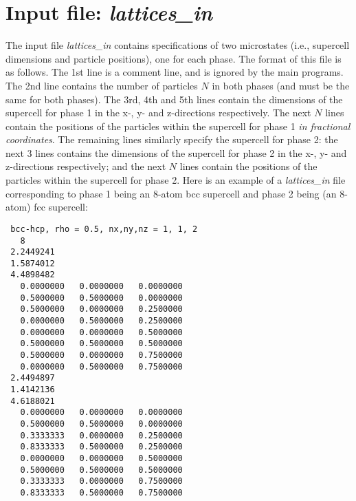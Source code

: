\documentclass{report}
\begin{document}
\section{Input file: \emph{lattices\_in}}
The input file \emph{lattices\_in} contains specifications of two microstates (i.e., supercell dimensions and particle positions), one for
each phase. The format of this file is as follows. The 1st line is a comment line, and is ignored by the main programs. The 2nd line contains
the number of particles $N$ in both phases (and must be the same for both phases). The 3rd, 4th and 5th lines contain the dimensions of the
supercell for phase 1 in the x-, y- and z-directions respectively. The next $N$ lines contain the positions of the particles within the supercell
for phase 1 \emph{in fractional coordinates}. The remaining lines similarly specify the supercell for phase 2: the next 3 lines contains the 
dimensions of the supercell for phase 2 in the x-, y- and z-directions respectively; and the next $N$ lines contain the positions of the 
particles within the supercell for phase 2. Here is an example of a \emph{lattices\_in} file corresponding to phase 1 being an 8-atom bcc
supercell and phase 2 being (an 8-atom) fcc supercell:
\begin{verbatim}
 bcc-hcp, rho = 0.5, nx,ny,nz = 1, 1, 2
   8
 2.2449241     
 1.5874012     
 4.4898482
   0.0000000   0.0000000   0.0000000     
   0.5000000   0.5000000   0.0000000
   0.5000000   0.0000000   0.2500000
   0.0000000   0.5000000   0.2500000
   0.0000000   0.0000000   0.5000000
   0.5000000   0.5000000   0.5000000
   0.5000000   0.0000000   0.7500000
   0.0000000   0.5000000   0.7500000
 2.4494897     
 1.4142136     
 4.6188021     
   0.0000000   0.0000000   0.0000000
   0.5000000   0.5000000   0.0000000
   0.3333333   0.0000000   0.2500000
   0.8333333   0.5000000   0.2500000
   0.0000000   0.0000000   0.5000000
   0.5000000   0.5000000   0.5000000
   0.3333333   0.0000000   0.7500000
   0.8333333   0.5000000   0.7500000
\end{verbatim}
\end{document}
